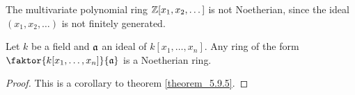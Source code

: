 \begin{example}\label{example_5.24}
  The multivariate polynomial ring $\mathbb{Z}[x_1, x_2, \dots]$ is not
  Noetherian, since the ideal $(x_1, x_2, \dots)$ is not finitely
  generated.
\end{example}

\begin{proposition}\label{proposition_7.1.8}
  Let $k$ be a field and $\mathfrak{a}$ an ideal of $k[x_1, \dots, x_n]$. Any ring
  of the form $\faktor{k[x_1, \dots, x_n]}{\af}$ is a Noetherian ring.
\end{proposition}
\begin{proof}
  This is a corollary to theorem \ref{theorem_5.9.5}.
\end{proof}
